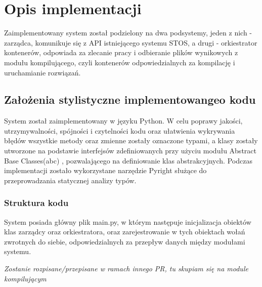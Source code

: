 \section{Opis implementacji}
Zaimplementowany system został podzielony na dwa podsystemy, jeden z nich - zarządca, komunikuje się z API istniejącego systemu STOS, a drugi - orkiestrator kontenerów, odpowiada za zlecanie pracy i odbieranie plików wynikowych z modułu kompilującego, czyli kontenerów odpowiedzialnych za kompilację i uruchamianie rozwiązań.

\subsection{Założenia stylistyczne implementowangeo kodu}
System został zaimplementowany w języku Python. W celu poprawy jakości, utrzymywalności, spójności i czytelności kodu oraz ułatwienia wykrywania błędów wszystkie metody oraz zmienne zostały oznaczone typami, a klasy zostały utworzone na podstawie interfejsów zdefiniowanych przy użyciu modułu Abstract Base Classes(abc) \cite{pythonAbc}, pozwalającego na definiowanie klas abstrakcyjnych. Podczas implementacji zostało wykorzystane narzędzie Pyright służące do przeprowadzania statycznej analizy typów.

\subsubsection{Struktura kodu}
System posiada główny plik main.py, w którym następuje inicjalizacja obiektów klas zarządcy oraz orkiestratora, oraz zarejestrowanie w tych obiektach wołań zwrotnych do siebie, odpowiedzialnych za przepływ danych między modułami systemu.
 
\textit{Zostanie rozpisane/przepisane w ramach innego PR, tu skupiam się na module kompilującym}